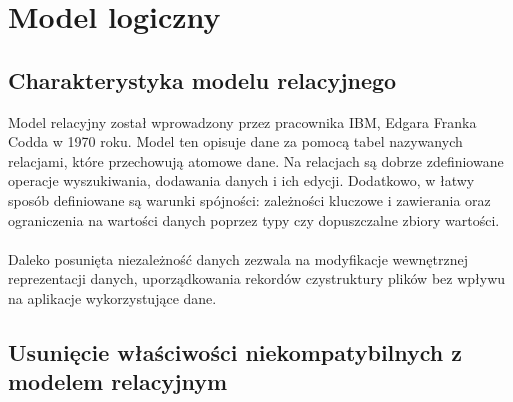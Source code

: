 \documentclass{mwrep}
\begin{document}
\chapter{Model logiczny}

\section{Charakterystyka modelu relacyjnego}
Model relacyjny został wprowadzony przez pracownika IBM, Edgara Franka Codda w 1970 roku\cite{Codd}. Model 
ten opisuje dane za pomocą tabel nazywanych relacjami, które przechowują atomowe dane. Na relacjach są dobrze
zdefiniowane operacje wyszukiwania, dodawania danych i ich edycji. Dodatkowo, w łatwy sposób 
definiowane są warunki spójności: zależności kluczowe i zawierania oraz ograniczenia na wartości danych poprzez
typy czy dopuszczalne zbiory wartości.\\
\\
\indent Daleko posunięta niezależność danych zezwala na modyfikacje wewnętrznej reprezentacji
danych, uporządkowania rekordów czystruktury plików bez wpływu na aplikacje
wykorzystujące dane.

\section{Usunięcie właściwości niekompatybilnych z modelem relacyjnym}
\end{document}
